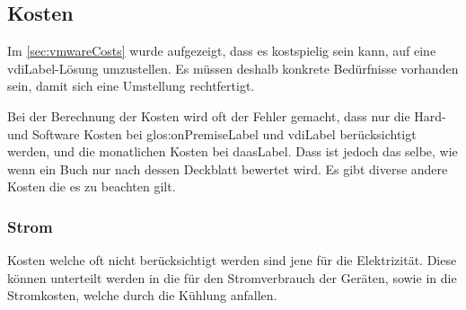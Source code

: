 \subsection{Kosten}

Im \cref{sec:vmwareCosts} wurde aufgezeigt, dass es kostspielig sein kann, auf eine \Gls{vdiLabel}-Lösung umzustellen. Es müssen deshalb konkrete Bedürfnisse vorhanden sein, damit sich eine Umstellung rechtfertigt.

Bei der Berechnung der Kosten wird oft der Fehler gemacht, dass nur die Hard- und Software Kosten bei \gls{glos:onPremiseLabel} und \Gls{vdiLabel} berücksichtigt werden, und die monatlichen Kosten bei \Gls{daasLabel}.
Dass ist jedoch das selbe, wie wenn ein Buch nur nach dessen Deckblatt bewertet wird.
Es gibt diverse andere Kosten die es zu beachten gilt.

\subsubsection{Strom}
Kosten welche oft nicht berücksichtigt werden sind jene für die Elektrizität.
Diese können unterteilt werden in die für den Stromverbrauch der Geräten, sowie in die Stromkosten, welche durch die Kühlung anfallen.

